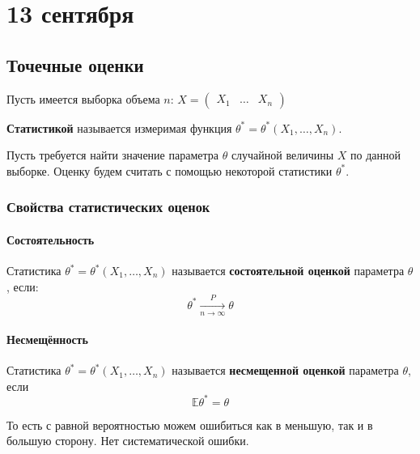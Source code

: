 \chapter{13 сентября}

\section{Точечные оценки}


Пусть имеется выборка объема \(n\): \(X = \begin{pmatrix}
    X_1 & \dots & X_n
\end{pmatrix}\)
\begin{definition}
    \textbf{Статистикой} называется измеримая функция \(\theta^* = \theta^*(X_1, \dots, X_n)\).
\end{definition}

Пусть требуется найти значение параметра \(\theta\) случайной величины \(X\) по данной выборке. Оценку будем считать с помощью некоторой статистики \(\theta^*\).

\subsection{Свойства статистических оценок}

\subsubsection{Состоятельность}

\begin{definition}
    Статистика \(\theta^* = \theta^*(X_1, \dots, X_n)\) называется \textbf{состоятельной оценкой} параметра \(\theta\), если:
    \[\theta^* \xrightarrow[n \to \infty]{P} \theta\]
\end{definition}

\subsubsection{Несмещённость}

\begin{definition}
    Статистика \(\theta^* = \theta^*(X_1, \dots, X_n)\) называется \textbf{несмещенной оценкой} параметра \(\theta\), если
    \[\mathbb{E} \theta^* = \theta\]
\end{definition}

\begin{remark}
    То есть с равной вероятностью можем ошибиться как в меньшую, так и в большую сторону. Нет систематической ошибки.
\end{remark}

